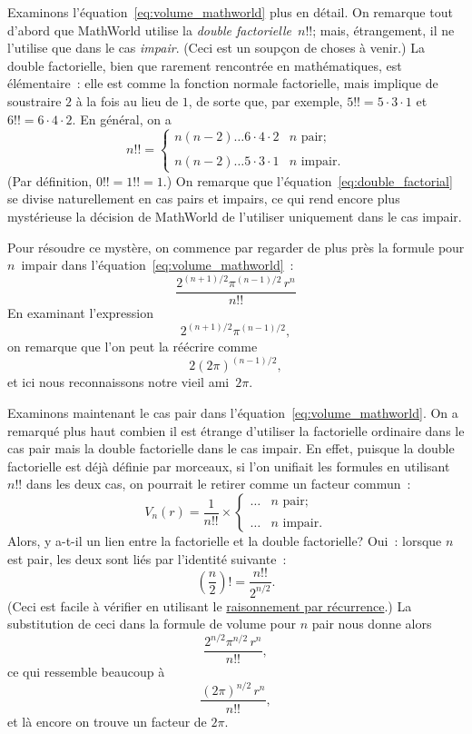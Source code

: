 Examinons l'équation~\eqref{eq:volume_mathworld} plus en détail. On
remarque tout d'abord que MathWorld utilise la
\emph{double factorielle}~$n!!$\ns; mais, étrangement, il ne l'utilise que dans le
cas \emph{impair}. (Ceci est un soupçon de choses à venir.) La double
factorielle, bien que rarement rencontrée en mathématiques, est élémentaire~:
elle est comme la fonction normale factorielle, mais implique de soustraire $2$
à la fois au lieu de $1$, de sorte que, par exemple, $5!! = 5 \cdot 3 \cdot 1$
et $6!! = 6 \cdot 4 \cdot 2$. En général, on a
\begin{equation}
\label{eq:double_factorial}
n!! = \begin{cases}
n(n-2)\ldots6\cdot4\cdot2 & n \text{ pair}; \\ \\
n(n-2)\ldots5\cdot3\cdot1 & n \text{ impair}.
\end{cases}
\end{equation}
(Par définition, $0!! =1!! = 1$.) On remarque que
l'équation~\eqref{eq:double_factorial} se divise naturellement en cas pairs et
impairs, ce qui rend encore plus mystérieuse la décision de MathWorld de
l'utiliser uniquement dans le cas impair.

Pour résoudre ce mystère, on commence par regarder de plus près la formule
pour $n$~impair dans l'équation~\eqref{eq:volume_mathworld}~:
\[ \frac{2^{(n+1)/2}\pi^{(n-1)/2}\,r^n}{n!!} \]
En examinant l'expression
\[ 2^{(n+1)/2}\pi^{(n-1)/2}, \]
on remarque que l'on peut la réécrire comme
\[ 2(2\pi)^{(n-1)/2}, \]
et ici nous reconnaissons notre vieil ami~$2\pi$.

Examinons maintenant le cas pair dans
l'équation~\eqref{eq:volume_mathworld}. On a remarqué plus haut combien il est
étrange d'utiliser la factorielle ordinaire dans le cas pair mais la double
factorielle dans le cas impair. En effet, puisque la double factorielle est déjà
définie par morceaux, si l'on unifiait les formules en utilisant $n!!$ dans les
deux cas, on pourrait le retirer comme un facteur commun~:
\[
V_n(r) = \frac{1}{n!!}\times \begin{cases}
\ldots & n \text{ pair}; \\ \\
 \ldots & n \text{ impair}.
 \end{cases}
\]
Alors, y a-t-il un lien entre la factorielle et la double factorielle\ns?
Oui~: lorsque $n$ est pair, les deux sont liés par l'identité suivante~:
\[ \left(\frac{n}{2}\right)! = \frac{n!!}{2^{n/2}}. \]
(Ceci est facile à vérifier en utilisant le
\href{https://fr.wikipedia.org/wiki/Raisonnement_par_récurrence}{raisonnement
par récurrence}.) La substitution de ceci dans la formule de volume pour $n$
pair nous donne alors
\[ \frac{2^{n/2}\pi^{n/2}\,r^n}{n!!}, \]
ce qui ressemble beaucoup à
\[ \frac{(2\pi)^{n/2}\,r^n}{n!!}, \]
et là encore on trouve un facteur de $2\pi$.

